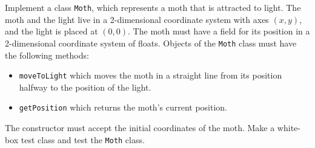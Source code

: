 Implement a class \lstinline{Moth}, which represents a moth that is attracted to light. The moth and the light live in a 2-dimensional coordinate system with axes $(x,y)$, and the light is placed at $(0,0)$. The moth must have a field for its position in a 2-dimensional coordinate system of floats. Objects of the \lstinline{Moth} class must have the following methods:
\begin{itemize}
\item \lstinline{moveToLight} which moves the moth in a straight line from its position halfway to the position of the light.
\item \lstinline{getPosition} which returns the moth's current position.
\end{itemize}
The constructor must accept the initial coordinates of the moth.
Make a white-box test class and test the \lstinline{Moth} class.
